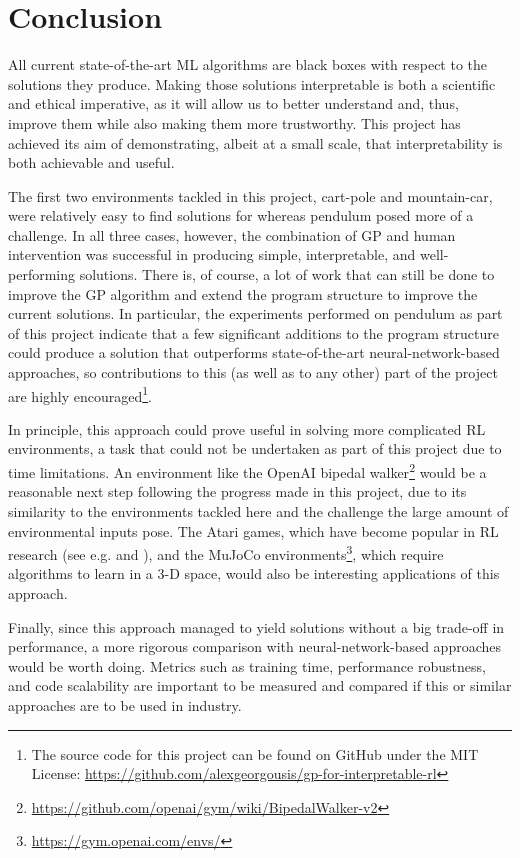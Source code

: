 \chapter{Conclusion}
All current state-of-the-art ML algorithms are black boxes with respect to the solutions they produce. Making those solutions interpretable is both a scientific and ethical imperative, as it will allow us to better understand and, thus, improve them while also making them more trustworthy. This project has achieved its aim of demonstrating, albeit at a small scale, that interpretability is both achievable and useful.

The first two environments tackled in this project, cart-pole and mountain-car, were relatively easy to find solutions for whereas pendulum posed more of a challenge. In all three cases, however, the combination of GP and human intervention was successful in producing simple, interpretable, and well-performing solutions. There is, of course, a lot of work that can still be done to improve the GP algorithm and extend the program structure to improve the current solutions. In particular, the experiments performed on pendulum as part of this project indicate that a few significant additions to the program structure could produce a solution that outperforms state-of-the-art neural-network-based approaches, so contributions to this (as well as to any other) part of the project are highly encouraged\footnote{The source code for this project can be found on GitHub under the MIT License: \url{https://github.com/alexgeorgousis/gp-for-interpretable-rl}}.

In principle, this approach could prove useful in solving more complicated RL environments, a task that could not be undertaken as part of this project due to time limitations. An environment like the OpenAI bipedal walker\footnote{\url{https://github.com/openai/gym/wiki/BipedalWalker-v2}} would be a reasonable next step following the progress made in this project, due to its similarity to the environments tackled here and the challenge the large amount of environmental inputs pose. The Atari games, which have become popular in RL research (see e.g. \cite{atari} and \cite{atari2}), and the MuJoCo environments\footnote{\url{https://gym.openai.com/envs/}}, which require algorithms to learn in a 3-D space, would also be interesting applications of this approach.

Finally, since this approach managed to yield solutions without a big trade-off in performance, a more rigorous comparison with neural-network-based approaches would be worth doing. Metrics such as training time, performance robustness, and code scalability are important to be measured and compared if this or similar approaches are to be used in industry.
